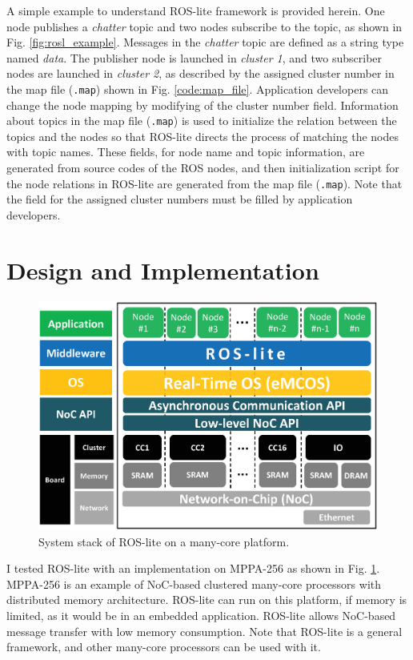 A simple example to understand ROS-lite framework is provided herein.
One node publishes a \emph{chatter} topic and two nodes subscribe to the topic, as shown in Fig. \ref{fig:rosl_example}.
Messages in the \emph{chatter} topic are defined as a string type named \emph{data}.
The publisher node is launched in \emph{cluster 1}, and two subscriber nodes are launched in \emph{cluster 2}, as described by the assigned cluster number in the map file (\texttt{.map}) shown in Fig. \ref{code:map_file}.
Application developers can change the node mapping by modifying of the cluster number field.
Information about topics in the map file (\texttt{.map}) is used to initialize the relation between the topics and the nodes so that ROS-lite directs the process of matching the nodes with topic names.
These fields, for node name and topic information, are generated from source codes of the ROS nodes, and then initialization script for the node relations in ROS-lite are generated from the map file (\texttt{.map}).
Note that the field for the assigned cluster numbers must be filled by application developers.

\section{Design and Implementation}
\label{sec:design_and_implementation}

\begin{figure}[H]
  \centering
  \includegraphics[width=0.8\linewidth]{../figure/roslite/software_stack.eps}
  \caption{\label{fig:rosl_software_stack}
    System stack of ROS-lite on a many-core platform.}
\end{figure}

I tested ROS-lite with an implementation on MPPA-256 as shown in Fig. \ref{fig:rosl_software_stack}.
MPPA-256 is an example of NoC-based clustered many-core processors with distributed memory architecture.
ROS-lite can run on this platform, if memory is limited, as it would be in an embedded application.
ROS-lite allows NoC-based message transfer with low memory consumption.
Note that ROS-lite is a general framework, and other many-core processors can be used with it.

